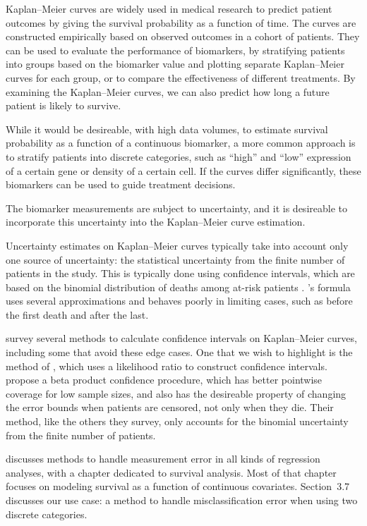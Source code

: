 \documentclass[pdflatex,sn-basic]{sn-jnl}%
\theoremstyle{thmstyleone}%
\theoremstyle{thmstyletwo}%
\theoremstyle{thmstylethree}%
\newcommand{\KM}{Kaplan--Meier} %
\begin{document}
\KM{} curves are widely used in medical research to predict patient outcomes by giving the survival probability as a function of time. The curves are constructed empirically based on observed outcomes in a cohort of patients. They can be used to evaluate the performance of biomarkers, by stratifying patients into groups based on the biomarker value and plotting separate \KM{} curves for each group, or to compare the effectiveness of different treatments. By examining the \KM{} curves, we can also predict how long a future patient is likely to survive.

While it would be desireable, with high data volumes, to estimate survival probability as a function of a continuous biomarker, a more common approach is to stratify patients into discrete categories, such as ``high'' and ``low'' expression of a certain gene or density of a certain cell.  If the curves differ significantly, these biomarkers can be used to guide treatment decisions.

The biomarker measurements are subject to uncertainty, and it is desireable to incorporate this uncertainty into the \KM{} curve estimation.

Uncertainty estimates on \KM{} curves typically take into account only one source of uncertainty: the statistical uncertainty from the finite number of patients in the study.  This is typically done using \citeauthor{Greenwood} confidence intervals, which are based on the binomial distribution of deaths among at-risk patients \citep{Greenwood,GreenwoodNotes}\@.  \citeauthor{Greenwood}'s formula uses several approximations and behaves poorly in limiting cases, such as before the first death and after the last.

 survey several methods to calculate confidence intervals on \KM{} curves, including some that avoid these edge cases.  One that we wish to highlight is the method of \citet{ThomasGrunkemeier}, which uses a likelihood ratio to construct confidence intervals.   propose a beta product confidence procedure, which has better pointwise coverage for low sample sizes, and also has the desireable property of changing the error bounds when patients are censored, not only when they die.  Their method, like the others they survey, only accounts for the binomial uncertainty from the finite number of patients.

\citet{YiBook} discusses methods to handle measurement error in all kinds of regression analyses, with a chapter dedicated to survival analysis.  Most of that chapter focuses on modeling survival as a function of continuous covariates.  Section~3.7 discusses our use case: a method to handle misclassification error when using two discrete categories.
\end{document}
